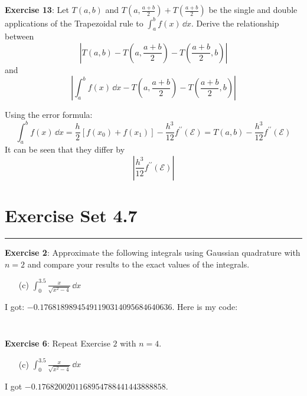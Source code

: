 \documentclass{article}
\begin{document}
\textbf{Exercise 13}: Let $T(a, b)$ and $T(a, \frac{a + b}{2}) + T(\frac{a + b}{2})$ be the single and double applications of the Trapezoidal rule to $\int_{a}^{b} f(x) \, \dd{x}$. Derive the relationship between
    \begin{equation*}
        \left\lvert T(a, b) - T\left(a, \dfrac{a + b}{2}\right) - T\left(\dfrac{a + b}{2}, b\right) \right\rvert
    \end{equation*}
and
    \begin{equation*}
        \left\lvert \int_{a}^{b} f(x) \, \dd{x} - T\left(a, \dfrac{a + b}{2}\right) - T\left(\dfrac{a + b}{2}, b\right) \right\rvert
    \end{equation*}
    \begin{answer}
        Using the error formula:
            \begin{equation*}
                \int_{a}^{b} f(x) \, \dd{x} = \dfrac{h}{2}[f(x_{0}) + f(x_{1})] - \dfrac{h^{3}}{12}f^{\prime\prime}(\mathcal{E}) = T(a, b) - \dfrac{h^{3}}{12}f^{\prime\prime}(\mathcal{E})
            \end{equation*}
        It can be seen that they differ by
            \begin{equation*}
                \left\lvert \dfrac{h^{3}}{12}f^{\prime\prime}(\mathcal{E}) \right\rvert
            \end{equation*}
    \end{answer}

\newpage
\section*{Exercise Set 4.7}
\hrule

\textbf{Exercise 2}: Approximate the following integrals using Gaussian quadrature with $n = 2$ and compare your results to the exact values of the integrals.
    \begin{itemize}
        \item [(c)] $\int_{0}^{3.5} \frac{x}{\sqrt{x^{2} - 4}} \, \dd{x}$
    \end{itemize}
    \begin{answer}
        I got: $-0.17681898945491190314095684640636$. Here is my code:
        \inputminted{matlab}{./code/gaussianQuadrature/gaussianQuad.m}
        \inputminted{matlab}{./code/script6.m}
    \end{answer}

\textbf{Exercise 6}: Repeat Exercise $2$ with $n = 4$.
    \begin{itemize}
            \item [(c)] $\int_{0}^{3.5} \frac{x}{\sqrt{x^{2} - 4}} \, \dd{x}$
    \end{itemize}
    \begin{answer}
        I got $-0.1768200201168954788441443888858$.
    \end{answer}
\end{document}
